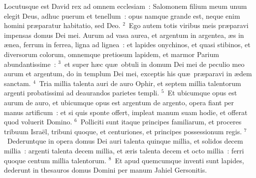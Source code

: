 \lettrine[lines=3,image=true,loversize=0.05,lraise=-0.03]{L}{}ocutusque est David rex ad omnem ecclesiam~: Salomonem filium meum unum elegit Deus, adhuc puerum et tenellum~: opus namque grande est, neque enim homini pr\ae paratur habitatio, sed Deo.
${}^{2}$~Ego autem totis viribus meis pr\ae paravi impensas domus Dei mei. Aurum ad vasa aurea, et argentum in argentea, \ae s in \ae nea, ferrum in ferrea, ligna ad lignea~: et lapides onychinos, et quasi stibinos, et diversorum colorum, omnemque pretiosum lapidem, et marmor Parium abundantissime~:
${}^{3}$~et super h\ae c qu\ae\ obtuli in domum Dei mei de peculio meo aurum et argentum, do in templum Dei mei, exceptis his qu\ae\ pr\ae paravi in \ae dem sanctam.
${}^{4}$~Tria millia talenta auri de auro Ophir, et septem millia talentorum argenti probatissimi ad deaurandos parietes templi.
${}^{5}$~Et ubicumque opus est aurum de auro, et ubicumque opus est argentum de argento, opera fiant per manus artificum~: et si quis sponte offert, impleat manum suam hodie, et offerat quod voluerit Domino.
${}^{6}$~Polliciti sunt itaque principes familiarum, et proceres tribuum Isra\"el, tribuni quoque, et centuriones, et principes possessionum regis.
${}^{7}$~Dederuntque in opera domus Dei auri talenta quinque millia, et solidos decem millia~: argenti talenta decem millia, et \ae ris talenta decem et octo millia~: ferri quoque centum millia talentorum.
${}^{8}$~Et apud quemcumque inventi sunt lapides, dederunt in thesauros domus Domini per manum Jahiel Gersonitis.


